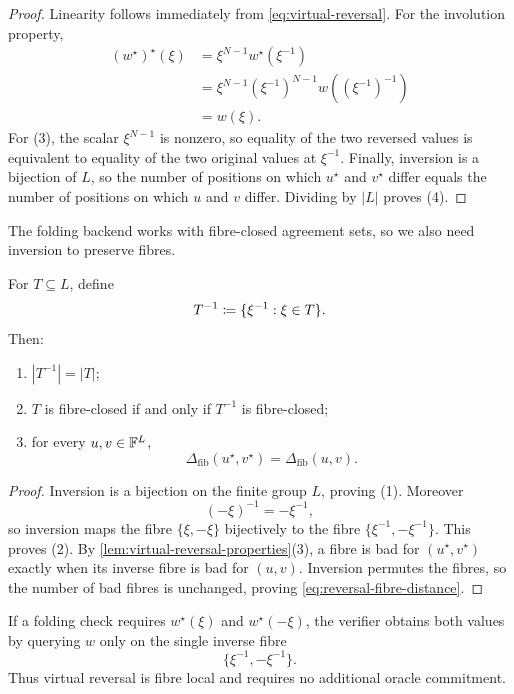 \begin{proof}
Linearity follows immediately from \eqref{eq:virtual-reversal}.  For the involution property,
\begin{align*}
  (w^{\star})^{\star}(\xi)
  &=\xi^{N-1}w^{\star}(\xi^{-1})\\
  &=\xi^{N-1}(\xi^{-1})^{N-1}w((\xi^{-1})^{-1})\\
  &=w(\xi).
\end{align*}
For (3), the scalar $\xi^{N-1}$ is nonzero, so equality of the two reversed values is equivalent to equality of the two original values at $\xi^{-1}$.  Finally, inversion is a bijection of $L$, so the number of positions on which $u^{\star}$ and $v^{\star}$ differ equals the number of positions on which $u$ and $v$ differ.  Dividing by $|L|$ proves (4).
\end{proof}

The folding backend works with fibre-closed agreement sets, so we also need inversion to preserve fibres.

\begin{lemma}
\label{lem:inversion-preserves-fibres}
For $T\subseteq L$, define
\[
  T^{-1}\coloneqq\{\xi^{-1}:\xi\in T\}.
\]
Then:
\begin{enumerate}[label=(\arabic*),leftmargin=*]
  \item $|T^{-1}|=|T|$;
  \item $T$ is fibre-closed if and only if $T^{-1}$ is fibre-closed;
  \item for every $u,v\in\mathbb{F}^L$,
  \begin{equation}
    \Delta_{\mathrm{fib}}(u^{\star},v^{\star})
    =\Delta_{\mathrm{fib}}(u,v).
    \label{eq:reversal-fibre-distance}
  \end{equation}
\end{enumerate}
\end{lemma}

\begin{proof}
Inversion is a bijection on the finite group $L$, proving (1).  Moreover
\[
  (-\xi)^{-1}=-\xi^{-1},
\]
so inversion maps the fibre $\{\xi,-\xi\}$ bijectively to the fibre $\{\xi^{-1},-\xi^{-1}\}$.  This proves (2).  By \cref{lem:virtual-reversal-properties}(3), a fibre is bad for $(u^{\star},v^{\star})$ exactly when its inverse fibre is bad for $(u,v)$.  Inversion permutes the fibres, so the number of bad fibres is unchanged, proving \eqref{eq:reversal-fibre-distance}.
\end{proof}

\begin{corollary}
\label{cor:reversal-fibre-local}
If a folding check requires $w^{\star}(\xi)$ and $w^{\star}(-\xi)$, the verifier obtains both values by querying $w$ only on the single inverse fibre
\[
  \{\xi^{-1},-\xi^{-1}\}.
\]
Thus virtual reversal is fibre local and requires no additional oracle commitment.
\end{corollary}

